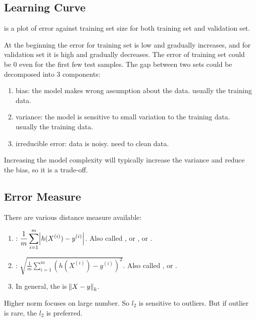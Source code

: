 \subsection{Learning Curve}

 is a plot of error against training set size for both training set and validation set. 

At the beginning the error for training set is low and gradually increases, and for validation set it is high and gradually decreases. The error of training set could be $0$ even for the first few test samples. The gap between two sets could be decomposed into 3 components:
\begin{enumerate}
	\item bias: the model makes wrong assumption about the data. usually  the training data.
	\item variance: the model is sensitive to small variation to the training data. usually  the training data.
	\item irreducible error: data is noisy. need to clean data.
\end{enumerate}

Increasing the model complexity will typically increase the variance and reduce the bias, so it is a trade-off.






\subsection{Error Measure}

There are various distance measure available:
\begin{enumerate}
    \item {}: $\displaystyle \frac{1}{m} \sum_{i=1}^m \abs{h(X^{(i)}) - y^{(i)}}$. Also called , or , or .
    \item {}: $\displaystyle \sqrt{\frac{1}{m} \sum_{i=1}^m \left(h(X^{(i)}) - y^{(i)} \right)^2}$. Also called , or .
    \item In general, the  is $\norm{X - y}_k$.
\end{enumerate}

Higher norm focuses on large number. So $l_2$ is sensitive to outliers. But if outlier is rare, the $l_2$ is preferred.







